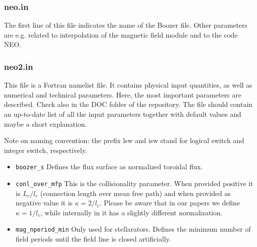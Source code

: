 \documentclass{article}
\newcommand{\vv}[1]{\texttt{\detokenize{#1}}}
\begin{document}
\subsubsection{neo.in\label{running_preparation_neoin}}
The first line of this file indicates the name of the Boozer file. Other
parameters are e.g. related to interpolation of the magnetic field
module and to the code NEO.

\subsubsection{neo2.in\label{running_preparation_neo2in}}
This file is a Fortran namelist file. It contains physical input
quantities, as well as numerical and technical parameters. Here, the
most important parameters are described.
Check also \vv{neo2.in.par-full} in the DOC folder of the \vv{NEO-2}
repository. The file should contain an up-to-date list of all the input
parameters together with default values and maybe a short explanation.

Note on naming convention: the prefix lsw and isw stand for logical
switch and integer switch, respectively.

\begin{itemize}
 \item \verb|boozer_s| \newline
 Defines the flux surface as normalized toroidal flux.
 \item \verb|conl_over_mfp|\newline
 This is the collisionality parameter. When provided positive it is
 $L_c/l_c$ (connection length over mean free path) and when provided as
 negative value it is $\kappa = 2/l_c$. Please be aware that in our
 papers we define $\kappa = 1/l_c$, while internally in \vv{NEO-2} it has a
 slightly different normalization.
 \item \verb|mag_nperiod_min|\newline
 Only used for stellarators. Defines the minimum number of field periods
 until the field line is closed artificially.
\end{itemize}
\end{document}
